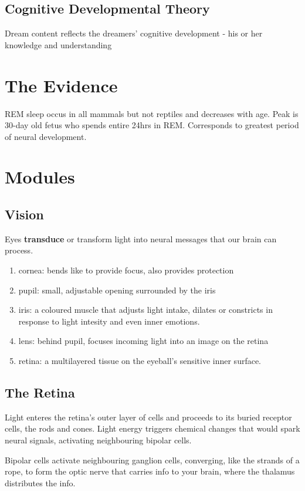 \documentclass[12pt]{article}
\begin{document}
\subsection*{Cognitive Developmental Theory}
Dream content reflects the dreamers' cognitive development - his or her knowledge and understanding

\section*{The Evidence}
REM sleep occus in all mammals but not reptiles and decreases with age. Peak is 30-day old fetus who spends entire 24hrs in REM. Corresponds to greatest period of neural development. 

\section*{Modules}

\subsection*{Vision}
Eyes \textbf{transduce} or transform light into neural messages that our brain can process.

\begin{enumerate}
  \item cornea: bends like to provide focus, also provides protection
  \item pupil: small, adjustable opening surrounded by the iris
  \item iris: a coloured muscle that adjusts light intake, dilates or constricts in response to light intesity and even inner emotions. 
  \item lens: behind pupil, focuses incoming light into an image on the retina
  \item retina: a multilayered tissue on the eyeball's sensitive inner surface.
\end{enumerate}

\subsection*{The Retina}
Light enteres the retina's outer layer of cells and proceeds to its buried receptor cells, the rods and cones. Light energy triggers chemical changes that would spark neural signals, activating neighbouring bipolar cells. 

Bipolar cells activate neighbouring ganglion cells, converging, like the strands of a rope, to form the optic nerve that carries info to your brain, where the thalamus distributes the info. 
\end{document}
